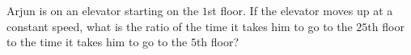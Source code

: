 Arjun is on an elevator starting on the $1$st floor. If the elevator moves up at a constant speed, what is the ratio of the time it takes him to go to the $25$th floor to the time it takes him to go to the $5$th floor?
